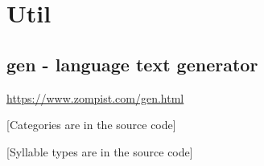 \section*{Util}

\subsection{gen - language text generator}
\url{https://www.zompist.com/gen.html}

{[}Categories are in the source code{]}
\iffalse
C=šždkgszpbtčjywcżmnñ
V=iueoa
N=nñm
S=šs
P=bdg
\fi

{[}Syllable types are in the source code{]}
\iffalse
CV
SPV
CVN
SPVN
\fi

